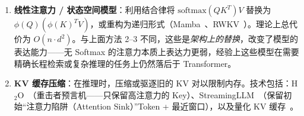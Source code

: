 \begin{enumerate}
  \item \textbf{线性注意力 / 状态空间模型}：利用结合律将 $\text{softmax}(QK^T)V$ 替换为 $\phi(Q)(\phi(K)^T V)$，或重构为递归形式（Mamba~\cite{gu2023mamba}、RWKV~\cite{peng2023rwkv}）。理论上总代价为 $O(n \cdot d^2)$。与上面方法 2--3 不同，这些是\emph{架构上的替换}，改变了模型的表达能力——无 Softmax 的注意力本质上表达力更弱，经验上这些模型在需要精确长程检索或复杂推理的任务上仍然落后于 Transformer。
  \item \textbf{KV 缓存压缩}：在推理时，压缩或驱逐旧的 KV 对以限制内存。技术包括：H$_2$O~\cite{zhang2023h2o}（重击者预言机——只保留高注意力的 Key）、StreamingLLM~\cite{xiao2024streamingllm}（保留初始``注意力陷阱（Attention Sink）''Token + 最近窗口），以及量化 KV 缓存~\cite{liu2024kivi}。
\end{enumerate}

